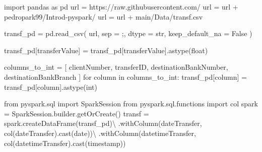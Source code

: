 \documentclass[
  11pt,
  letterpaper,
  DIV=11,
  numbers=noendperiod]{scrreprt}
\newenvironment{Shaded}{\begin{snugshade}}{\end{snugshade}}
\newcommand{\BuiltInTok}[1]{\textcolor[rgb]{0.00,0.23,0.31}{#1}}
\newcommand{\ControlFlowTok}[1]{\textcolor[rgb]{0.00,0.23,0.31}{#1}}
\newcommand{\ImportTok}[1]{\textcolor[rgb]{0.00,0.46,0.62}{#1}}
\newcommand{\KeywordTok}[1]{\textcolor[rgb]{0.00,0.23,0.31}{#1}}
\newcommand{\NormalTok}[1]{\textcolor[rgb]{0.00,0.23,0.31}{#1}}
\newcommand{\OperatorTok}[1]{\textcolor[rgb]{0.37,0.37,0.37}{#1}}
\newcommand{\StringTok}[1]{\textcolor[rgb]{0.13,0.47,0.30}{#1}}
\newcommand{\VariableTok}[1]{\textcolor[rgb]{0.07,0.07,0.07}{#1}}
\begin{document}
\begin{Shaded}
\begin{Highlighting}[]
\ImportTok{import}\NormalTok{ pandas }\ImportTok{as}\NormalTok{ pd}
\NormalTok{url }\OperatorTok{=} \StringTok{\textquotesingle{}https://raw.githubusercontent.com/\textquotesingle{}}
\NormalTok{url }\OperatorTok{=}\NormalTok{ url }\OperatorTok{+} \StringTok{\textquotesingle{}pedropark99/Introd{-}pyspark/\textquotesingle{}}
\NormalTok{url }\OperatorTok{=}\NormalTok{ url }\OperatorTok{+} \StringTok{\textquotesingle{}main/Data/transf.csv\textquotesingle{}}

\NormalTok{transf\_pd }\OperatorTok{=}\NormalTok{ pd.read\_csv(}
\NormalTok{  url, sep }\OperatorTok{=} \StringTok{\textquotesingle{};\textquotesingle{}}\NormalTok{,}
\NormalTok{  dtype }\OperatorTok{=} \BuiltInTok{str}\NormalTok{,}
\NormalTok{  keep\_default\_na }\OperatorTok{=} \VariableTok{False}
\NormalTok{)}

\NormalTok{transf\_pd[}\StringTok{\textquotesingle{}transferValue\textquotesingle{}}\NormalTok{] }\OperatorTok{=}\NormalTok{ transf\_pd[}\StringTok{\textquotesingle{}transferValue\textquotesingle{}}\NormalTok{].astype(}\StringTok{\textquotesingle{}float\textquotesingle{}}\NormalTok{)}

\NormalTok{columns\_to\_int }\OperatorTok{=}\NormalTok{ [}
  \StringTok{\textquotesingle{}clientNumber\textquotesingle{}}\NormalTok{,}
  \StringTok{\textquotesingle{}transferID\textquotesingle{}}\NormalTok{,}
  \StringTok{\textquotesingle{}destinationBankNumber\textquotesingle{}}\NormalTok{,}
  \StringTok{\textquotesingle{}destinationBankBranch\textquotesingle{}}
\NormalTok{]}
\ControlFlowTok{for}\NormalTok{ column }\KeywordTok{in}\NormalTok{ columns\_to\_int:}
\NormalTok{  transf\_pd[column] }\OperatorTok{=}\NormalTok{ transf\_pd[column].astype(}\StringTok{\textquotesingle{}int\textquotesingle{}}\NormalTok{)}

\ImportTok{from}\NormalTok{ pyspark.sql }\ImportTok{import}\NormalTok{ SparkSession}
\ImportTok{from}\NormalTok{ pyspark.sql.functions }\ImportTok{import}\NormalTok{ col}
\NormalTok{spark }\OperatorTok{=}\NormalTok{ SparkSession.builder.getOrCreate()}
\NormalTok{transf }\OperatorTok{=}\NormalTok{ spark.createDataFrame(transf\_pd)}\OperatorTok{\textbackslash{}}
\NormalTok{  .withColumn(}\StringTok{\textquotesingle{}dateTransfer\textquotesingle{}}\NormalTok{, col(}\StringTok{\textquotesingle{}dateTransfer\textquotesingle{}}\NormalTok{).cast(}\StringTok{\textquotesingle{}date\textquotesingle{}}\NormalTok{))}\OperatorTok{\textbackslash{}}
\NormalTok{  .withColumn(}\StringTok{\textquotesingle{}datetimeTransfer\textquotesingle{}}\NormalTok{, col(}\StringTok{\textquotesingle{}datetimeTransfer\textquotesingle{}}\NormalTok{).cast(}\StringTok{\textquotesingle{}timestamp\textquotesingle{}}\NormalTok{))}
\end{Highlighting}
\end{Shaded}
\end{document}
